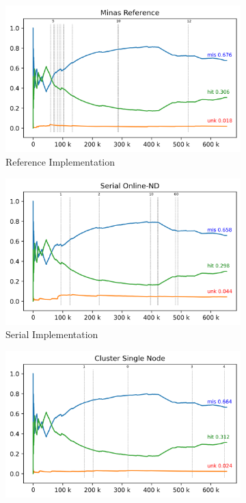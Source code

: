 \begin{figure}[hbt]
    \begin{subfigure}{.5\linewidth}
        \centering
        \includegraphics[width=\linewidth]{experiments/revised-java.log.png}
        \caption{Reference Implementation}
        \label{fig:validation-sub-java}
    \end{subfigure}
    \begin{subfigure}{.5\linewidth}
        \centering
        \includegraphics[width=\linewidth]{experiments/online-nd.log.png}
        \caption{Serial Implementation}
        \label{fig:validation-sub-serial}
    \end{subfigure}
  \vspace{5mm}
    \begin{subfigure}{.5\linewidth}
      \centering
      \includegraphics[width=\linewidth]{experiments/tmi-base.log.png}

\end{subfigure}
\end{figure}
